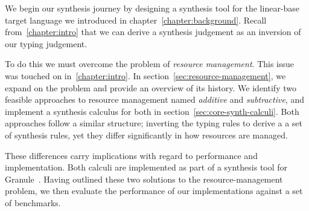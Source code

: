 

We begin our synthesis journey by designing a synthesis tool for the
linear-base target language we introduced in chapter~\ref{chapter:background}.
Recall from~\ref{chapter:intro} that we can derive a synthesis judgement as an
inversion of our typing judgement.

To do this we must overcome the problem of \textit{resource management}. This
issue was touched on in~\ref{chapter:intro}. In
section~\ref{sec:resource-management}, we expand on the problem and provide an
overview of its history. We identify two feasible approaches to resource
management named \textit{additive} and \textit{subtractive}, and implement a
synthesis calculus for both in section~\ref{sec:core-synth-calculi}. Both
approaches follow a similar structure; inverting the typing rules to derive a
a set of synthesis rules, yet they differ significantly in how resources are
managed.

These differences carry implications with regard to performance and
implementation. Both calculi are implemented as part of a synthesis tool for Granule~\cite{}. Having outlined these two solutions to the resource-management problem, we then
evaluate the performance of our implementations against a set of benchmarks.


